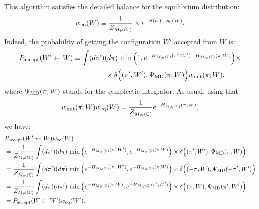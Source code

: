\documentclass[12pt]{article}
\begin{document}
This algorithm satisfies the detailed balance
for the equilibrium distribution:
\begin{align}
  w_{\rm eq}(W)
  \equiv
  \frac{1}{Z_{M_N(\mathbb{C})}} \times e^{-S(U)-S_0(W)}.
\end{align}
Indeed, the probability of getting the configuration $W'$ accepted
from $W$ is:
\begin{align}
  P_{\rm accept}(W' \leftarrow W)
  &\equiv
    \int(d\pi')(d\pi)\,
    \min \Big(
    1, e^{-H_{M_N(\mathbb{C})}(\pi',W') + H_{M_N(\mathbb{C})}(\pi, W)}
    \Big)\times \\
  & ~~~~~~~~~~~~~~
    \times
    \delta\Big(
    (\pi', W'), \Psi_{\rm MD} (\pi,W)
    \Big)
    w_{\rm init}(\pi;W),
\end{align}
where $\Psi_{\rm MD} (\pi,W)$ stands for the
symplectic integrator.
As usual, using that
\begin{align}
  w_{\rm init}(\pi; W) w_{\rm eq}(W)
  =
  \frac{1}{Z_{M_N(\mathbb{C})}}
  e^{-H_{M_N(\mathbb{C})}(\pi, W)},
\end{align}
we have:
\begin{align}
  &
  P_{\rm accept}(W' \leftarrow W)w_{\rm eq}(W) \nonumber\\
  &=
    \frac{1}{Z_{M_N(\mathbb{C})}}
    \int(d\pi')(d\pi)\,
    \min \Big(
    e^{-H_{M_N(\mathbb{C})}(\pi',W')},
    e^{-H_{M_N(\mathbb{C})}(\pi, W)}
    \Big)\times
    \delta\Big(
    (\pi', W'), \Psi_{\rm MD} (\pi,W)
    \Big) \nonumber \\
  &=
    \frac{1}{Z_{M_N(\mathbb{C})}}
    \int(d\pi')(d\pi)\,
    \min \Big(
    e^{-H_{M_N(\mathbb{C})}(\pi',W')},
    e^{-H_{M_N(\mathbb{C})}(\pi, W)}
    \Big)\times
    \delta\Big(
    (-\pi,W), \Psi_{\rm MD}(-\pi', W')
    \Big) \nonumber \\
  &=
    \frac{1}{Z_{M_N(\mathbb{C})}}
    \int(d\pi)(d\pi')\,
    \min \Big(
    e^{-H_{M_N(\mathbb{C})}(\pi, W)},
    e^{-H_{M_N(\mathbb{C})}(\pi',W')}
    \Big)\times
    \delta\Big(
    (\pi,W), \Psi_{\rm MD}(\pi', W')
    \Big) \nonumber \\
  &
    =
    P_{\rm accept}(W \leftarrow W') w_{\rm eq}(W').
\end{align}
\end{document}

